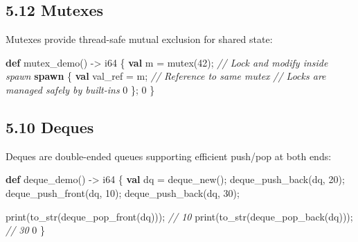 \documentclass[
  english,
]{book}
\newenvironment{Shaded}{\begin{snugshade}}{\end{snugshade}}
\newcommand{\CommentTok}[1]{\textcolor[rgb]{0.42,0.60,0.33}{\textit{#1}}}
\newcommand{\DataTypeTok}[1]{\textcolor[rgb]{0.31,0.79,0.69}{#1}}
\newcommand{\DecValTok}[1]{\textcolor[rgb]{0.71,0.81,0.66}{#1}}
\newcommand{\FunctionTok}[1]{\textcolor[rgb]{0.86,0.86,0.67}{#1}}
\newcommand{\KeywordTok}[1]{\textcolor[rgb]{0.34,0.61,0.84}{\textbf{#1}}}
\newcommand{\NormalTok}[1]{\textcolor[rgb]{0.83,0.83,0.83}{#1}}
\newcommand{\OperatorTok}[1]{\textcolor[rgb]{0.83,0.83,0.83}{#1}}
\begin{document}
\subsection{5.12 Mutexes}\label{mutexes}

Mutexes provide thread-safe mutual exclusion for shared state:

\begin{Shaded}
\begin{Highlighting}[]
\KeywordTok{def}\NormalTok{ mutex\_demo() }\OperatorTok{{-}\textgreater{}} \DataTypeTok{i64}\NormalTok{ \{}
    \KeywordTok{val}\NormalTok{ m }\OperatorTok{=} \DataTypeTok{mutex}\NormalTok{(}\DecValTok{42}\NormalTok{);}
    \CommentTok{// Lock and modify inside spawn}
    \KeywordTok{spawn}\NormalTok{ \{}
        \KeywordTok{val}\NormalTok{ val\_ref }\OperatorTok{=}\NormalTok{ m; }\CommentTok{// Reference to same mutex}
        \CommentTok{// Locks are managed safely by built{-}ins}
        \DecValTok{0}
\NormalTok{    \};}
    \DecValTok{0}
\NormalTok{\}}
\end{Highlighting}
\end{Shaded}

\subsection{5.10 Deques}\label{deques-1}

Deques are double-ended queues supporting efficient push/pop at both
ends:

\begin{Shaded}
\begin{Highlighting}[]
\KeywordTok{def}\NormalTok{ deque\_demo() }\OperatorTok{{-}\textgreater{}} \DataTypeTok{i64}\NormalTok{ \{}
    \KeywordTok{val}\NormalTok{ dq }\OperatorTok{=} \FunctionTok{deque\_new}\NormalTok{();}
    \FunctionTok{deque\_push\_back}\NormalTok{(dq, }\DecValTok{20}\NormalTok{);}
    \FunctionTok{deque\_push\_front}\NormalTok{(dq, }\DecValTok{10}\NormalTok{);}
    \FunctionTok{deque\_push\_back}\NormalTok{(dq, }\DecValTok{30}\NormalTok{);}
    
    \FunctionTok{print}\NormalTok{(}\FunctionTok{to\_str}\NormalTok{(}\FunctionTok{deque\_pop\_front}\NormalTok{(dq))); }\CommentTok{// 10}
    \FunctionTok{print}\NormalTok{(}\FunctionTok{to\_str}\NormalTok{(}\FunctionTok{deque\_pop\_back}\NormalTok{(dq)));  }\CommentTok{// 30}
    \DecValTok{0}
\NormalTok{\}}
\end{Highlighting}
\end{Shaded}
\end{document}
